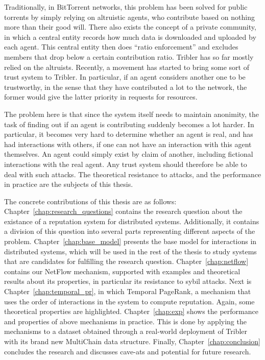 \documentclass[a4paper,11pt]{book}
\theoremstyle{definition}
\begin{document}
Traditionally, in BitTorrent networks, this problem has been solved for public torrents
by simply relying on altruistic agents, who contribute based on nothing more than
their good will. There also exists the concept of a private community, in which a central
entity records how much data is downloaded and uploaded by each agent. This central
entity then does ``ratio enforcement'' and excludes members that drop below a certain
contribution ratio. Tribler has so far mostly relied on the altruists. 
Recently, a movement has started to bring some sort of trust system to Tribler. In particular,
if an agent considers another one to be trustworthy, in the sense that they have contributed
a lot to the network, the former would give the latter priority in requests for resources.

The problem here is that since the system itself needs to maintain anonimity, the task of
finding out if an agent is contributing suddenly becomes a lot harder. In particular, 
it becomes very hard to determine whether an agent is real, and has had interactions with
others, if one can not have an interaction with this agent themselves. An agent could simply
exist by claim of another, including fictional interactions with the real agent. Any trust system
should therefore be able to deal with such attacks. The theoretical resistance to attacks,
and the performance in practice are the subjects of this thesis.

The concrete contributions of this thesis are as follows: Chapter~\ref{chap:research_questions} contains
the research question about the existance of a reputation system for distributed systems.
Additionally, it contains a division of this question into several parts representing different aspects of the problem.
Chapter~\ref{chap:base_model} presents the base model for interactions in distributed systems, which will
be used in the rest of the thesis to study systems that are candidates for fulfilling the research question.
Chapter~\ref{chap:netflow} contains our NetFlow mechanism, supported with examples and theoretical results
about its properties, in particular its resistance to sybil attacks. Next is Chapter~\ref{chap:temporal_pr}, 
in which Temporal PageRank, a mechanism that uses the order of interactions in the system to compute reputation.
Again, some theoretical properties are highlighted. Chapter~\ref{chap:exp} shows the performance and properties
of above mechanisms in practice. This is done by applying the mechanisms to a dataset obtained through
a real-world deployment of Tribler with its brand new MultiChain data structure. Finally, Chapter~\ref{chap:conclusion}
concludes the research and discusses cave-ats and potential for future research.
\end{document}
